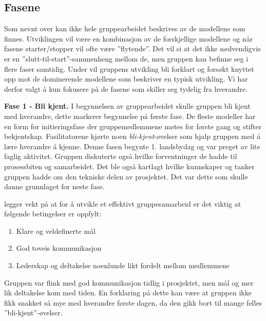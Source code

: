 \subsection{Fasene}
Som nevnt over kan ikke hele gruppearbeidet beskrives av de modellene som finnes. 
Utviklingen vil være en kombinasjon av de forskjellige modellene og når fasene starter/stopper vil ofte være ''flytende''.
Det vil si at det ikke nødvendigvis er en ''slutt-til-start''-sammenheng mellom de, men gruppen kan befinne seg i flere faser samtidig. 
Under vil gruppens utvikling bli forklart og forsøkt knyttet opp mot de dominerende modellene som beskriver en typisk utvikling. 
Vi har derfor valgt å kun fokusere på de fasene som skiller seg tydelig fra hverandre.
\vspace{\secspace}



\textbf{\Large Fase 1 - Bli kjent.}
I begynnelsen av gruppearbeidet skulle gruppen bli kjent med hverandre, dette markerer begynnelse på første fase.
De fleste modeller har en form for initieringsfase der gruppemedlemmene møtes for første gang og stifter bekjentskap. 
Fasilitatorene kjørte noen \textit{bli-kjent}-øvelser som hjalp gruppen med å lære hverandre å kjenne. 
Denne fasen begynte 1. landsbydag og var preget av lite faglig aktivitet. 
Gruppen diskuterte også hvilke forventninger de hadde til prosessbiten og samarbeidet. 
Det ble også kartlagt hvilke kunnskaper og tanker gruppen hadde om den tekniske delen av prosjektet. 
Det var dette som skulle danne grunnlaget for neste fase. 

\citet{johnson} legger vekt på at for å utvikle et effektivt gruppesamarbeid er det viktig at følgende betingelser er oppfylt:
\begin{enumerate}
    \item Klare og veldefinerte mål
    \item God toveis kommunikasjon
    \item Lederskap og deltakelse noenlunde likt fordelt mellom medlemmene
\end{enumerate} 
Gruppen var flink med god kommunikasjon tidlig i prosjektet, men mål og mer lik deltakelse kom med tiden. 
En forklaring på dette kan være at gruppen ikke fikk snakket så mye med hverandre første dagen, da den gikk bort til mange felles ''bli-kjent''-øvelser. 
\vspace{\secspace}

